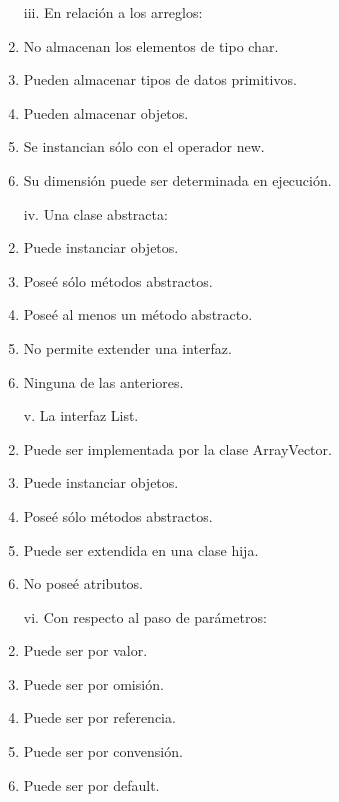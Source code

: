 \documentclass[10pt]{article}
\begin{document}
{\begin{enumerate}
\begin{multicols}{2}
			\begin{enumerate}[label=(\alph*)]
				\item[iii.] En relaci\'on a los arreglos:
				\item No almacenan los elementos de tipo char.
				\item Pueden almacenar tipos de datos primitivos.
				\item Pueden almacenar objetos.
				\item Se instancian s\'olo con el operador new.
				\item Su dimensi\'on puede ser determinada en ejecuci\'on.
			\end{enumerate}

			\begin{enumerate}[label=(\alph*)]
				\item[iv.] Una clase abstracta:
				\item Puede instanciar objetos.
				\item Pose\'e s\'olo m\'etodos abstractos.
				\item Pose\'e al menos un m\'etodo abstracto.
				\item No permite extender una interfaz.
				\item Ninguna de las anteriores.
			\end{enumerate}

			\begin{enumerate}[label=(\alph*)]
				\item[v.] La interfaz List.
				\item Puede ser implementada por la clase ArrayVector.
				\item Puede instanciar objetos.
				\item Pose\'e s\'olo m\'etodos abstractos.
				\item Puede ser extendida en una clase hija.
				\item No pose\'e atributos.
			\end{enumerate}

			\begin{enumerate}[label=(\alph*)]
				\item[vi.] Con respecto al paso de par\'ametros:
				\item Puede ser por valor.
				\item Puede ser por omisi\'on.
				\item Puede ser por referencia.
				\item Puede ser por convensi\'on.
				\item Puede ser por default.
			\end{enumerate}


\end{multicols}
\end{enumerate}}
\end{document}
